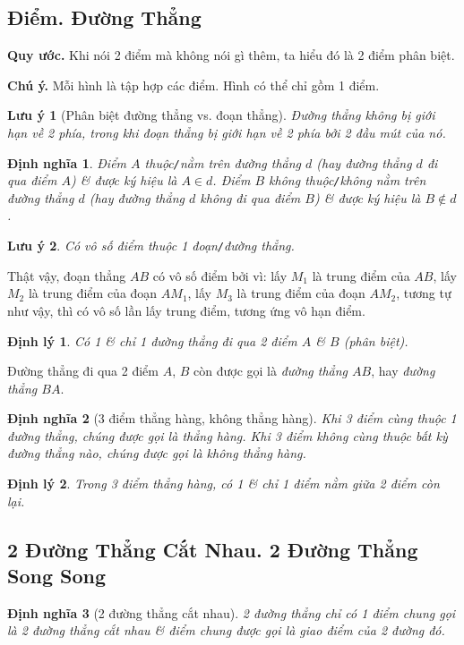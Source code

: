 \documentclass{article}
\numberwithin{equation}{section}
\newtheorem{definition}{Định nghĩa}[section]
\newtheorem{theorem}{Định lý}[section]
\newtheorem{remark}{Lưu ý}[section]
\begin{document}
\subsection{Điểm. Đường Thẳng}
\textbf{Quy ước.} Khi nói 2 điểm mà không nói gì thêm, ta hiểu đó là 2 điểm phân biệt.

\noindent\textbf{Chú ý.} Mỗi hình là tập hợp các điểm. Hình có thể chỉ gồm 1 điểm.

\begin{remark}[Phân biệt đường thẳng vs. đoạn thẳng]
	Đường thẳng không bị giới hạn về 2 phía, trong khi đoạn thẳng bị giới hạn về 2 phía bởi 2 đầu mút của nó.
\end{remark}

\begin{definition}
	Điểm $A$ \emph{thuộc\texttt{/}nằm trên} đường thẳng $d$ (hay đường thẳng $d$ \emph{đi qua} điểm $A$) \& được ký hiệu là $A\in d$. Điểm $B$ \emph{không thuộc\texttt{/}không nằm trên} đường thẳng $d$ (hay đường thẳng $d$ \emph{không đi qua} điểm $B$) \& được ký hiệu là $B\notin d$.
\end{definition}

\begin{remark}
	Có vô số điểm thuộc 1 đoạn\texttt{/}đường thẳng.
\end{remark}
Thật vậy, đoạn thẳng $AB$ có vô số điểm bởi vì: lấy $M_1$ là trung điểm của $AB$, lấy $M_2$ là trung điểm của đoạn $AM_1$, lấy $M_3$ là trung điểm của đoạn $AM_2$, tương tự như vậy, thì có vô số lần lấy trung điểm, tương ứng vô hạn điểm.

\begin{theorem}
	Có 1 \& chỉ 1 đường thẳng đi qua 2 điểm $A$ \& $B$ (phân biệt).
\end{theorem}
Đường thẳng đi qua 2 điểm $A$, $B$ còn được gọi là \emph{đường thẳng $AB$}, hay \emph{đường thẳng $BA$}.

\begin{definition}[3 điểm thẳng hàng, không thẳng hàng]
	Khi 3 điểm cùng thuộc 1 đường thẳng, chúng được gọi là \emph{thẳng hàng}. Khi 3 điểm không cùng thuộc bất kỳ đường thẳng nào, chúng được gọi là \emph{không thẳng hàng}.
\end{definition}

\begin{theorem}
	Trong 3 điểm thẳng hàng, có 1 \& chỉ 1 điểm nằm giữa 2 điểm còn lại.
\end{theorem}

\subsection{2 Đường Thẳng Cắt Nhau. 2 Đường Thẳng Song Song}
\begin{definition}[2 đường thẳng cắt nhau]
	2 đường thẳng chỉ có 1 điểm chung gọi là \emph{2 đường thẳng cắt nhau} \& điểm chung được gọi là \emph{giao điểm} của 2 đường đó.
\end{definition}
\end{document}
